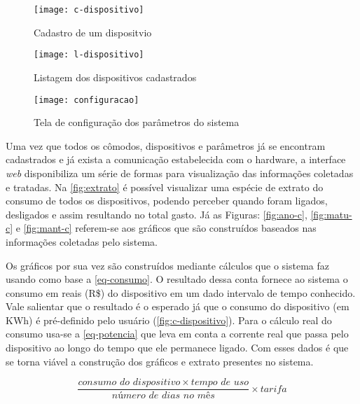 \begin{figure}[h!]
	\texttt{[image: c-dispositivo]}
	\centering
	\caption[Cadastro de um dispositivo]{Cadastro de um dispositvio}
	\label{fig:c-dispositivo} 
\end{figure}
\FloatBarrier

\begin{figure}[h!]
	\texttt{[image: l-dispositivo]}
	\centering
	\caption[Listagem dos dispositivos cadastrados]{Listagem dos dispositivos cadastrados}
	\label{fig:l-dispositivo} 
\end{figure}
\FloatBarrier

\begin{figure}[h!]
	\texttt{[image: configuracao]}
	\centering
	\caption[Tela de configuração dos parâmetros do sistema]{Tela de configuração dos parâmetros do sistema}
	\label{fig:configuracao-ft} 
\end{figure}
\FloatBarrier

Uma vez que todos os cômodos, dispositivos e parâmetros já se encontram cadastrados e já exista a comunicação estabelecida com o hardware, a interface
\textit{web} disponibiliza um série de formas para visualização das informações coletadas e tratadas. Na \autoref{fig:extrato} é possível visualizar
uma espécie de extrato do consumo de todos os dispositivos, podendo perceber quando foram ligados, desligados e assim resultando no total gasto.
Já as Figuras: \ref{fig:ano-c}, \ref{fig:matu-c} e \ref{fig:mant-c} referem-se aos gráficos que são construídos baseados nas informações coletadas pelo sistema.

Os gráficos por sua vez são construídos mediante cálculos que o sistema faz usando como base a \autoref{eq-consumo}. O resultado dessa conta
fornece ao sistema o consumo em reais (R\$) do dispositivo em um dado intervalo de tempo conhecido. Vale salientar que o resultado é o esperado já que o consumo
do dispositivo (em KWh) é pré-definido pelo usuário (\autoref{fig:c-dispositivo}). Para o cálculo real do consumo usa-se a \autoref{eq-potencia} que leva em conta a corrente real que passa
pelo dispositivo ao longo do tempo que ele permanece ligado. Com esses dados é que se torna viável a construção dos gráficos e extrato presentes no sistema.

\begin{equation} \label{eq-consumo}
	\frac{consumo \, \, do \, \, dispositivo \times tempo \, \, de \, \, uso}{número \, \, de \, \, dias \, \, no \, \, mês} \times tarifa
\end{equation}

